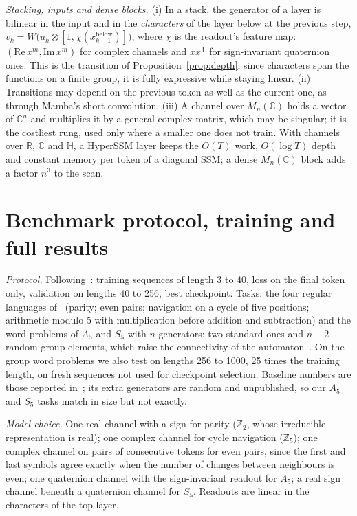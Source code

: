 \documentclass[aps,prx,reprint,superscriptaddress,longbibliography,nofootinbib,floatfix]{revtex4-2}
\newcommand{\HH}{\mathbb{H}}
\newcommand{\CC}{\mathbb{C}}
\newcommand{\RR}{\mathbb{R}}
\newcommand{\ZZ}{\mathbb{Z}}
\theoremstyle{plain}
\theoremstyle{definition}
\begin{document}
\emph{Stacking, inputs and dense blocks.} (i) In a stack, the generator of a
layer is bilinear in the input and in the \emph{characters} of the layer
below at the previous step,
$v_k=W\bigl(u_k\otimes[1,\chi(x^{\mathrm{below}}_{k-1})]\bigr)$, where
$\chi$ is the readout's feature map: $(\mathrm{Re}\,x^m,\mathrm{Im}\,x^m)$
for complex channels and $xx^{\mathsf T}$ for sign-invariant quaternion
ones. This is the transition of Proposition~\ref{prop:depth}; since
characters span the functions on a finite group, it is fully expressive while
staying linear. (ii) Transitions may depend on the previous token as well as
the current one, as through Mamba's short convolution. (iii) A channel over
$M_n(\CC)$ holds a vector of $\CC^n$ and multiplies it by a general complex
matrix, which may be singular; it is the costliest rung, used only where a
smaller one does not train. With channels over $\RR$, $\CC$ and $\HH$, a
HyperSSM layer keeps the $O(T)$ work, $O(\log T)$ depth and constant memory
per token of a diagonal SSM; a dense $M_n(\CC)$ block adds a factor $n^3$ to
the scan.

\section{Benchmark protocol, training and full results}\label{sm:bench}

\emph{Protocol.} Following~\cite{walker_slice,pdssm}: training sequences of
length 3 to 40, loss on the final token only, validation on lengths 40 to
256, best checkpoint. Tasks: the four regular languages of~\cite{deletang}
(parity; even pairs; navigation on a cycle of five positions; arithmetic
modulo 5 with multiplication before addition and subtraction) and the word
problems of $A_5$ and $S_5$ with $n$ generators: two standard ones and $n-2$
random group elements, which raise the connectivity of the
automaton~\cite{pdssm}. On the group word problems we also test
on lengths 256 to 1000, 25 times the training length, on fresh
sequences not used for checkpoint selection. Baseline numbers are those
reported in~\cite{pdssm}; its extra generators are random and unpublished,
so our $A_5$ and $S_5$ tasks match in size but not exactly.

\emph{Model choice.} One real channel with a sign for parity ($\ZZ_2$, whose
irreducible representation is real); one complex channel for cycle
navigation ($\ZZ_5$); one complex channel on pairs of consecutive tokens for
even pairs, since the first and last symbols agree exactly when the number
of changes between neighbours is even; one quaternion channel with the
sign-invariant readout for $A_5$; a real sign channel beneath a quaternion
channel for $S_5$. Readouts are linear in the characters of the top layer.
\end{document}
